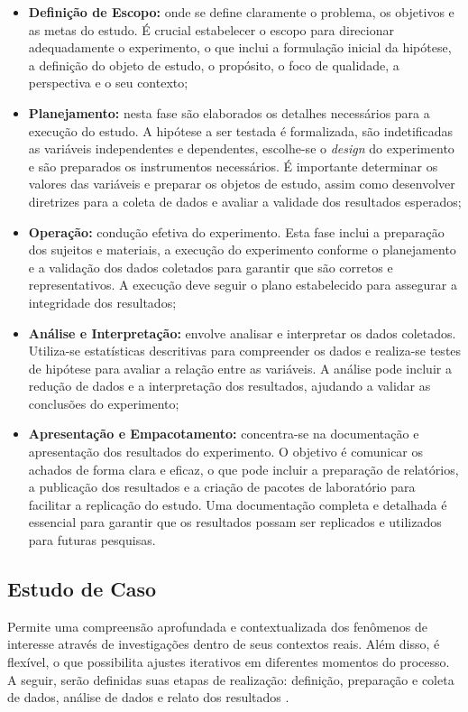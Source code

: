 \begin{itemize}
    \item \textbf{Definição de Escopo:} onde se define claramente o problema, os objetivos e as metas do estudo. É crucial estabelecer o escopo para direcionar adequadamente o experimento, o que inclui a formulação inicial da hipótese, a definição do objeto de estudo, o propósito, o foco de qualidade, a perspectiva e o seu contexto;
    \item \textbf{Planejamento:} nesta fase são elaborados os detalhes necessários para a execução do estudo. A hipótese a ser testada é formalizada, são indetificadas as variáveis independentes e dependentes, escolhe-se o \textit{design} do experimento e são preparados os instrumentos necessários. É importante determinar os valores das variáveis e preparar os objetos de estudo, assim como desenvolver diretrizes para a coleta de dados e avaliar a validade dos resultados esperados;
    \item \textbf{Operação:} condução efetiva do experimento. Esta fase inclui a preparação dos sujeitos e materiais, a execução do experimento conforme o planejamento e a validação dos dados coletados para garantir que são corretos e representativos. A execução deve seguir o plano estabelecido para assegurar a integridade dos resultados;
    \item \textbf{Análise e Interpretação:} envolve analisar e interpretar os dados coletados. Utiliza-se estatísticas descritivas para compreender os dados e realiza-se testes de hipótese para avaliar a relação entre as variáveis. A análise pode incluir a redução de dados e a interpretação dos resultados, ajudando a validar as conclusões do experimento;
    \item \textbf{Apresentação e Empacotamento:} concentra-se na documentação e apresentação dos resultados do experimento. O objetivo é comunicar os achados de forma clara e eficaz, o que pode incluir a preparação de relatórios, a publicação dos resultados e a criação de pacotes de laboratório para facilitar a replicação do estudo. Uma documentação completa e detalhada é essencial para garantir que os resultados possam ser replicados e utilizados para futuras pesquisas.
\end{itemize}


\subsection{Estudo de Caso}

Permite uma compreensão aprofundada e contextualizada dos fenômenos de interesse através de investigações dentro de seus contextos reais. Além disso, é flexível, o que possibilita ajustes iterativos em diferentes momentos do processo. A seguir, serão definidas suas etapas de realização: definição, preparação e coleta de dados, análise de dados e relato dos resultados \cite{yin_case_study_2009}.

